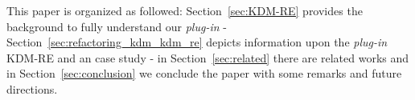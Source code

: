 
This paper is organized as followed: Section~\ref{sec:KDM-RE} provides the background to fully understand our \textit{plug-in} - Section~\ref{sec:refactoring_kdm_kdm_re} depicts information upon the \textit{plug-in} KDM-RE and an case study - in Section~\ref{sec:related} there are related works and in Section~\ref{sec:conclusion} we conclude the paper with some remarks and future directions.







